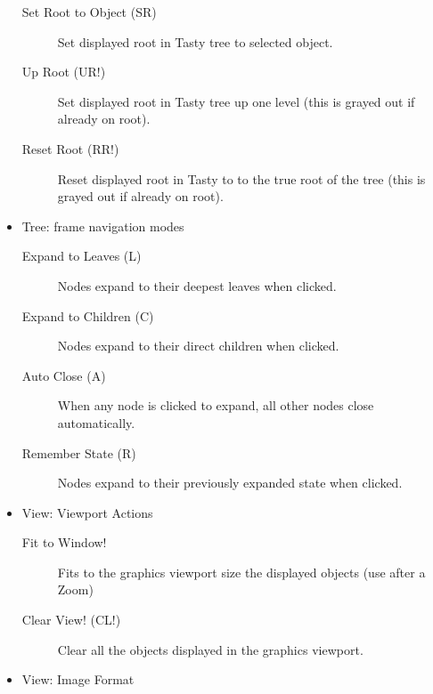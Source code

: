 \documentclass [11pt]{book}
\begin{document}
\begin{itemize}
\begin{description}
\item [Set Root to Object (SR)]
Set displayed root in Tasty tree to selected object.

\item [Up Root (UR!)]
Set displayed root in Tasty tree up one level (this is grayed out if already on root).

\item [Reset Root (RR!)]
Reset displayed root in Tasty to to the true root of the tree (this is grayed out if already on root).

\end{description}



\item Tree: frame navigation modes

\begin{description}

\item [Expand to Leaves (L)]
Nodes expand to their deepest leaves when clicked. 

\item [Expand to Children (C)]
Nodes expand to their direct children when clicked.

\item [Auto Close (A)]
When any node is clicked to expand, all other nodes close automatically.

\item [Remember State (R)]
Nodes expand to their previously expanded state when clicked.

\end{description}



\item View: Viewport Actions

\begin{description}

\item [Fit to Window!]
Fits to the graphics viewport size the displayed objects (use after a Zoom)

\item [Clear View! (CL!)]
Clear all the objects displayed in the graphics viewport.

\end{description}



\item View: Image Format

\begin{description}


\end{description}
\end{itemize}
\end{document}
